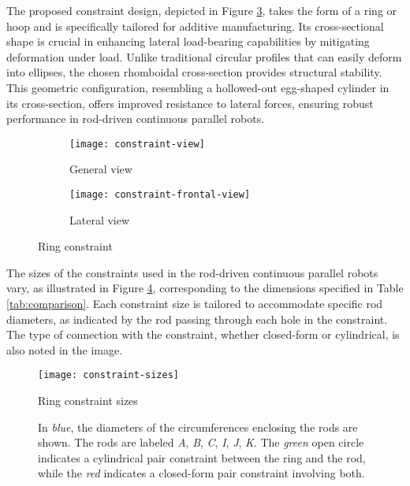 The proposed constraint design, depicted in Figure \ref{fig:ring-constraint}, takes the form of a ring or hoop and is specifically tailored for additive manufacturing. Its cross-sectional shape is crucial in enhancing lateral load-bearing capabilities by mitigating deformation under load. Unlike traditional circular profiles that can easily deform into ellipses, the chosen rhomboidal cross-section provides structural stability. This geometric configuration, resembling a hollowed-out egg-shaped cylinder in its cross-section, offers improved resistance to lateral forces, ensuring robust performance in rod-driven continuous parallel robots.

\begin{figure}[H]
    \centering
    \begin{subfigure}[t]{0.6\textwidth}
        \texttt{[image: constraint-view]}
        \caption{General view}
        \label{fig:cons-view}
    \end{subfigure}
    \begin{subfigure}[t]{0.6\textwidth}
        \texttt{[image: constraint-frontal-view]}
        \caption{Lateral view}
        \label{fig:cons-front-view}
    \end{subfigure}
    \caption{Ring constraint}
    \label{fig:ring-constraint}
\end{figure}

The sizes of the constraints used in the rod-driven continuous parallel robots vary, as illustrated in Figure \ref{fig:cons-sizes}, corresponding to the dimensions specified in Table \ref{tab:comparison}. Each constraint size is tailored to accommodate specific rod diameters, as indicated by the rod passing through each hole in the constraint. The type of connection with the constraint, whether closed-form or cylindrical, is also noted in the image.

\begin{figure}
    \centering
    \texttt{[image: constraint-sizes]}
    \caption{Ring constraint sizes}
    \label{fig:cons-sizes}
    \caption*{In \textit{blue}, the diameters of the circumferences enclosing the rods are shown. The rods are labeled \textit{A}, \textit{B}, \textit{C}, \textit{I}, \textit{J}, \textit{K}. The \textit{green} open circle indicates a cylindrical pair constraint between the ring and the rod, while the \textit{red} indicates a closed-form pair constraint involving both.}
\end{figure}

